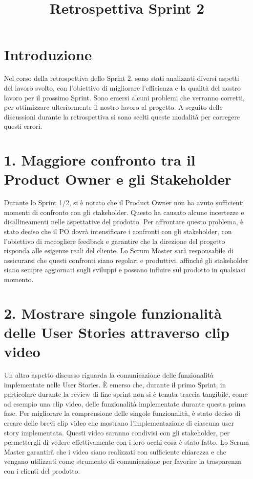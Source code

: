 \documentclass{article}
\title{Retrospettiva Sprint 2}
\author{}
\date{}
\begin{document}
\maketitle

\section*{Introduzione}
Nel corso della retrospettiva dello Sprint 2, sono stati analizzati diversi aspetti del lavoro svolto, con l’obiettivo di migliorare l'efficienza e la qualità del nostro lavoro per il prossimo Sprint. Sono emersi alcuni problemi che verranno corretti, per ottimizzare ulteriormente il nostro lavoro al progetto. A seguito delle discussioni durante la retrospettiva si sono scelti queste modalità per corregere questi errori.

\section*{1. Maggiore confronto tra il Product Owner e gli Stakeholder}
Durante lo Sprint 1/2, si è notato che il Product Owner non ha avuto sufficienti momenti di confronto con gli stakeholder. Questo ha causato alcune incertezze e disallineamenti nelle aspettative del prodotto. Per affrontare questo problema, è stato deciso che il PO dovrà intensificare i confronti con gli stakeholder, con l’obiettivo di raccogliere feedback e garantire che la direzione del progetto risponda alle esigenze reali del cliente. Lo Scrum Master sarà responsabile di assicurarsi che questi confronti siano regolari e produttivi, affinché gli stakeholder siano sempre aggiornati sugli sviluppi e possano influire sul prodotto in qualsiasi momento.

\section*{2. Mostrare singole funzionalità delle User Stories attraverso clip video}
Un altro aspetto discusso riguarda la comunicazione delle funzionalità implementate nelle User Stories. È emerso che, durante il primo Sprint, in particolare durante la review di fine sprint non si è tenuta traccia tangibile, come ad esempio una clip video, delle funzionalità implementate durante questa prima fase. Per migliorare la comprensione delle singole funzionalità, è stato deciso di creare delle brevi clip video che mostrano l'implementazione di ciascuna user story implementata. Questi video saranno condivisi con gli stakeholder, per permettergli di vedere effettivamente con i loro occhi cosa è stato fatto. Lo Scrum Master garantirà che i video siano realizzati con sufficiente chiarezza e che vengano utilizzati come strumento di comunicazione per favorire la trasparenza con i clienti del prodotto.
\end{document}
